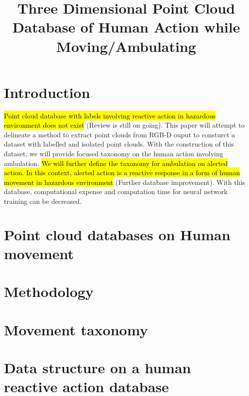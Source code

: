 \documentclass[a4paper, 10pt]{article}
\title{Three Dimensional Point Cloud Database of Human Action while Moving/Ambulating}
\begin{document}
\maketitle
\section{Introduction}

\hl{Point cloud database with labels involving reactive action in 
hazardous environment does not exist} (Review is still on going).
This paper will attempt to delineate a method to extract point clouds from RGB-D ouput 
to consturct a dataset with labelled and isolated point clouds. With the construction 
of this dataset, we will provide focused taxonomy 
on the human action involving ambulation. \hl{We will further define the taxonomy for 
ambulation on alerted action. In this context, alerted action is a reactive response 
in a form of human movement in hazardous environment} (Further database improvement). With this database, computational expense and computation time for neural network training 
can be decreased. 

\section{Point cloud databases on Human movement}
\section{Methodology}
\section{Movement taxonomy}
\section{Data structure on a human reactive action database}
\end{document}
